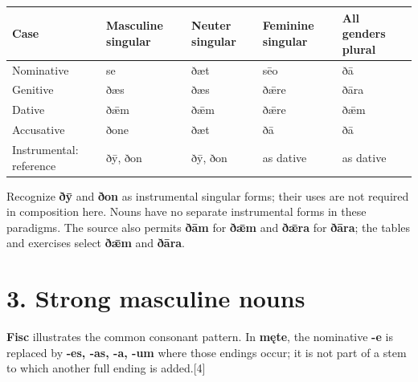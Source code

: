 \par\begingroup
\fontsize{10.5}{13.2}\selectfont
\setlength{\LTleft}{0pt}\setlength{\LTright}{\fill}
\noindent
\begin{tabular}{@{}>{\raggedright\arraybackslash}p{22.0mm}>{\raggedright\arraybackslash}p{22.688mm}>{\raggedright\arraybackslash}p{22.688mm}>{\raggedright\arraybackslash}p{22.688mm}>{\raggedright\arraybackslash}p{22.688mm}@{}}
\toprule
\textbf{Case} & \textbf{Masculine singular} & \textbf{Neuter singular} & \textbf{Feminine singular} & \textbf{All genders plural} \\
\midrule
Nominative & se & ðæt & sēo & ðā \\
Genitive & ðæs & ðæs & ðǣre & ðāra \\
Dative & ðǣm & ðǣm & ðǣre & ðǣm \\
Accusative & ðone & ðæt & ðā & ðā \\
Instrumental: reference & ðȳ, ðon & ðȳ, ðon & as dative & as dative \\
\bottomrule
\end{tabular}
\par\endgroup

Recognize \textbf{ðȳ} and \textbf{ðon} as instrumental singular forms; their uses are not required in composition here. Nouns have no separate instrumental forms in these paradigms. The source also permits \textbf{ðām} for \textbf{ðǣm} and \textbf{ðǣra} for \textbf{ðāra}; the tables and exercises select \textbf{ðǣm} and \textbf{ðāra}.

\section*{3. Strong masculine nouns}

\textbf{Fisc} illustrates the common consonant pattern. In \textbf{męte}, the nominative \textbf{-e} is replaced by \textbf{-es, -as, -a, -um} where those endings occur; it is not part of a stem to which another full ending is added.[4]

